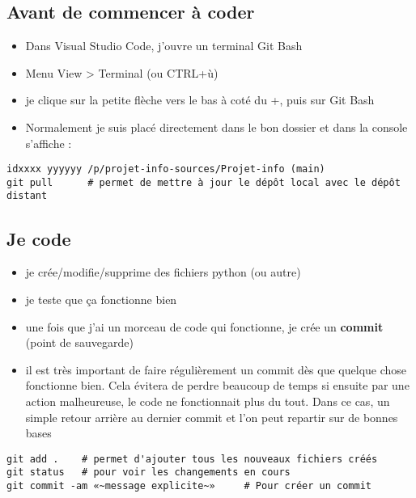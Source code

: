 \documentclass[11pt]{article}
\begin{document}
\subsection*{Avant de commencer à coder}

\begin{itemize}
    \item Dans Visual Studio Code, j'ouvre un terminal Git Bash
    \item Menu View > Terminal (ou CTRL+ù)
    \item je clique sur la petite flèche vers le bas à coté du +, puis sur Git Bash
    \item Normalement je suis placé directement dans le bon dossier et dans la console s'affiche : 
\end{itemize}


\noindent
\verb"idxxxx yyyyyy /p/projet-info-sources/Projet-info (main)" \\
\verb"git pull      # permet de mettre à jour le dépôt local avec le dépôt distant"




\subsection*{Je code}

\begin{itemize}
    \item je crée/modifie/supprime des fichiers python (ou autre)
    \item je teste que ça fonctionne bien
    \item une fois que j'ai un morceau de code qui fonctionne, je crée un \textbf{commit} (point de sauvegarde)
    \item il est très important de faire régulièrement un commit dès que quelque chose fonctionne bien. Cela évitera de perdre beaucoup de temps si ensuite par une action malheureuse, le code ne fonctionnait plus du tout. Dans ce cas, un simple retour arrière au dernier commit et l'on peut repartir sur de bonnes bases
\end{itemize}

\noindent
\verb"git add .    # permet d'ajouter tous les nouveaux fichiers créés" \\
\verb"git status   # pour voir les changements en cours" \\
\verb"git commit -am «~message explicite~»     # Pour créer un commit" \\

\bigbreak
\end{document}
